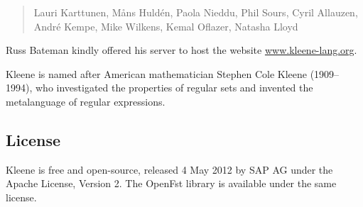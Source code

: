 \documentclass[letterpaper,12pt]{book}
\providecommand{\init}{}\renewcommand{\init}{\MakeUppercase}
\begin{document}
\begin{quote}
Lauri Karttunen, M\r{a}ns Huld\'en, Paola Nieddu, Phil Sours, Cyril
Allauzen, André Kempe, 
Mike Wilkens,
Kemal Oflazer, Natasha Lloyd
\end{quote}

\noindent
Russ Bateman kindly offered his server to host the website
\url{www.kleene-lang.org}.

Kleene is named after American mathematician Stephen Cole Kleene
(1909--1994), who investigated the properties of regular sets and invented
the metalanguage of regular expressions.

\subsection*{License}

Kleene is free and open-source, released 4 May 2012  by \init{sap ag} under the Apache License, Version
2.  The OpenFst library is available
under the same license.

\nocite{hulden:2009thesis}
\nocite{allauzen+riley+schalkwyk+skut+mohri:2007}


\tableofcontents
% 


\mainmatter






\appendix




\backmatter

%



\end{document}
